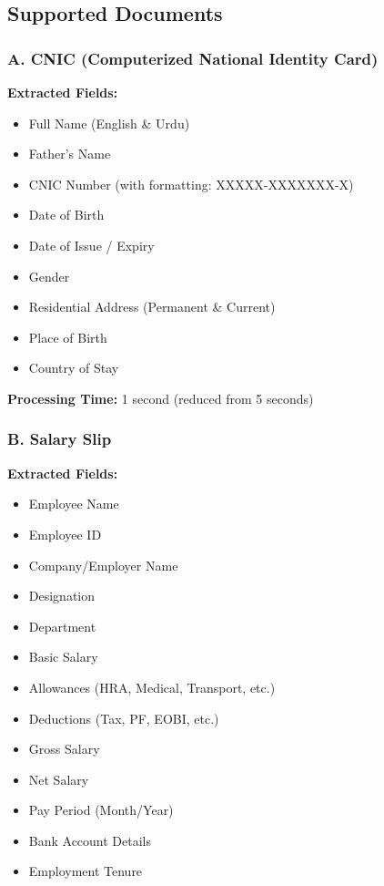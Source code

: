 \documentclass[12pt,a4paper]{article}
\begin{document}
\subsection{Supported Documents}

\subsubsection{A. CNIC (Computerized National Identity Card)}

\textbf{Extracted Fields:}
\begin{itemize}[noitemsep]
    \item Full Name (English \& Urdu)
    \item Father's Name
    \item CNIC Number (with formatting: XXXXX-XXXXXXX-X)
    \item Date of Birth
    \item Date of Issue / Expiry
    \item Gender
    \item Residential Address (Permanent \& Current)
    \item Place of Birth
    \item Country of Stay
\end{itemize}

\textbf{Processing Time:} 1 second (reduced from 5 seconds)

\subsubsection{B. Salary Slip}

\textbf{Extracted Fields:}
\begin{itemize}[noitemsep]
    \item Employee Name
    \item Employee ID
    \item Company/Employer Name
    \item Designation
    \item Department
    \item Basic Salary
    \item Allowances (HRA, Medical, Transport, etc.)
    \item Deductions (Tax, PF, EOBI, etc.)
    \item Gross Salary
    \item Net Salary
    \item Pay Period (Month/Year)
    \item Bank Account Details
    \item Employment Tenure
\end{itemize}
\end{document}
